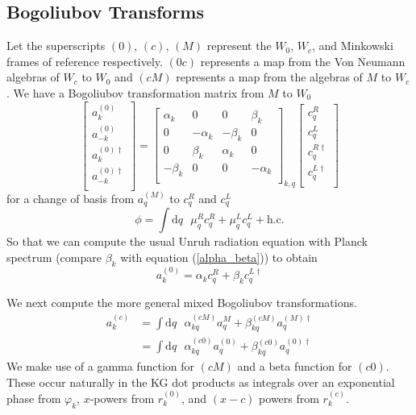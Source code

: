 \documentclass[12pt,a4paper]{article}
\newcommand{\dv}[1]{\mathrm{d} #1 \text{ }}
\begin{document}
\subsection{Bogoliubov Transforms}
Let the superscripts $(0)$, $(c)$, $(M)$ represent the $W_0$, $W_c$, and Minkowski frames of reference respectively.  $(0c)$ represents a map from the Von Neumann algebras of $W_c$ to $W_0$ and $(cM)$ represents a map from the algebras of $M$ to $W_c$.  We have a Bogoliubov transformation matrix from $M$ to $W_0$
\begin{equation}
  \left[ \begin{array}{l}
    a^{(0)}_k \\
    a^{(0)}_{-k} \\
    \hline
    a^{(0)\dagger}_k \\
    a^{(0)\dagger}_{-k} \\
 \end{array} \right] = 
  \left[
\begin{array}{rr|rr}
    \alpha_k &       0   &  0       & \beta_k \\
    0        & -\alpha_k & -\beta_k & 0 \\
    \hline
    0        & \beta_k   & \alpha_k & 0 \\
    -\beta_k &    0      &   0      & -\alpha_k \\
\end{array} \right]_{k,q}
\left[ \begin{array}{l}
    c^R_q \\
    c^L_q \\
    \hline
    c^{R\dagger}_q \\
    c^{L\dagger}_q \\
 \end{array} \right]
\end{equation}
for a change of basis from $a^{(M)}_q$ to $c^R_q$ and $c^L_q$
\begin{equation}
  \phi = \int \dv{q} \mu_q^R c_q^R + \mu_q^L c_q^L + \text{h.c.}
  \label{c_ladder}
\end{equation}
So that we can compute the usual Unruh radiation equation with Planck spectrum (compare $\beta_k$ with equation (\ref{alpha_beta})) to obtain
\begin{equation}
  a_k^{(0)} = \alpha_k c_q^R + \beta_k c_q^{L\dagger}
\label{a_in_c}
\end{equation}

We next compute the more general mixed Bogoliubov transformations.
\begin{equation}
  \begin{array}{ll}
  a^{(c)}_k &= \int \dv{q} \alpha^{(cM)}_{kq} a^{M}_q + \beta^{(cM)}_{kq} a^{(M)\dagger}_q \\
  &= \int \dv{q} \alpha^{(c0)}_{kq} a^{(0)}_q + \beta^{(c0)}_{kq} a^{(0)\dagger}_q
  \end{array}
\end{equation}
We make use of a gamma function for $(cM)$ and a beta function for $(c0)$. These occur naturally in the KG dot products as integrals over an exponential phase from $\varphi_k$, $x$-powers from $r_k^{(0)}$, and $(x-c)$ powers from $r_k^{(c)}$.
\end{document}
